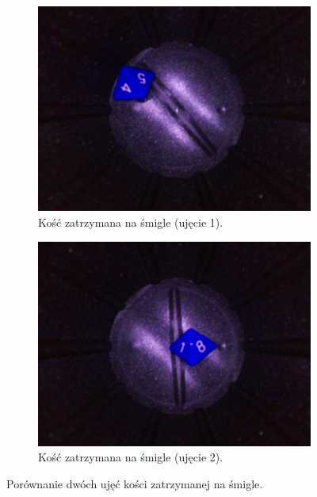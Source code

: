 \begin{figure}[h]
    \centering
    \begin{subfigure}[t]{0.45\linewidth}
        \centering
        \includegraphics[width=\linewidth]{chapters/04-czytanie/figures/niepewne}
        \caption{Kość zatrzymana na śmigle (ujęcie 1).}
        \label{fig:niepewne}
    \end{subfigure}
    \hfill
    \begin{subfigure}[t]{0.45\linewidth}
        \centering
        \includegraphics[width=\linewidth]{chapters/04-czytanie/figures/smiglo}
        \caption{Kość zatrzymana na śmigle (ujęcie 2).}
        \label{fig:smiglo}
    \end{subfigure}
    \caption{Porównanie dwóch ujęć kości zatrzymanej na śmigle.}
    \label{fig:smiglocombined}
\end{figure}


